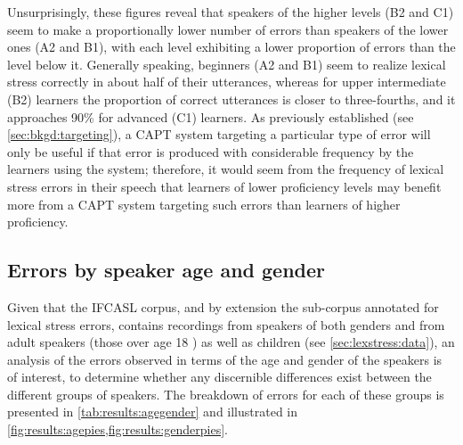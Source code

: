 			
	Unsurprisingly, these figures reveal that  speakers of the higher levels (B2 and C1) seem to make a proportionally lower number of errors than speakers of the lower ones (A2 and B1), with each level exhibiting a lower proportion of errors than the level below it. Generally speaking, beginners  (A2 and B1) seem to realize lexical stress correctly in about half of their utterances, whereas for upper intermediate (B2) learners the proportion of correct utterances is closer to three-fourths, and it approaches 90\% for advanced (C1) learners. As previously established (see \cref{sec:bkgd:targeting}), a CAPT system targeting a particular type of error will only be useful if that error is produced with considerable frequency by the learners using the system; therefore, it would seem from the frequency of lexical stress errors in their speech that learners of lower proficiency levels may benefit more from a CAPT system targeting such errors than learners of higher proficiency. 
			
			
		
		\subsection{Errors by speaker age and gender}
		\label{sec:results:agegender}
			
			
			Given that the IFCASL corpus, and by extension the sub-corpus annotated for lexical stress errors, contains recordings from speakers of both genders and from adult speakers (those over age 18 ) as well as children (see \cref{sec:lexstress:data}), an analysis of the errors observed in terms of the age and gender of the speakers is of interest, to determine whether any discernible differences exist between the different groups of speakers. The breakdown of errors for each of these groups is presented in \cref{tab:results:agegender} and illustrated in \cref{fig:results:agepies,fig:results:genderpies}.
			
		
			
